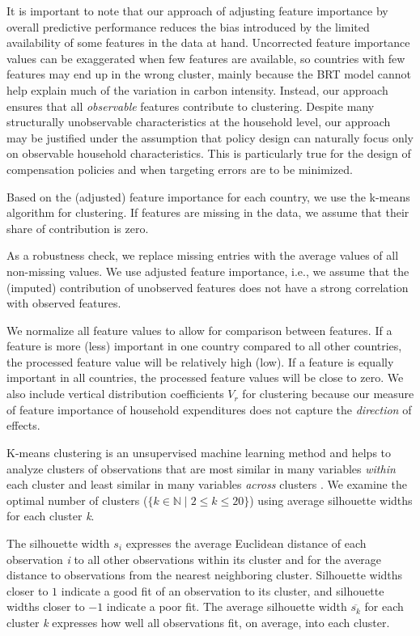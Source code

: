 \documentclass[12pt, a4paper]{article}
\begin{document}
\begin{refsection}
It is important to note that our approach of adjusting feature importance by overall predictive performance reduces the bias introduced by the limited availability of some features in the data at hand. Uncorrected feature importance values can be exaggerated when few features are available, so countries with few features may end up in the wrong cluster, mainly because the BRT model cannot help explain much of the variation in carbon intensity. Instead, our approach ensures that all \textit{observable} features contribute to clustering. Despite many structurally unobservable characteristics at the household level, our approach may be justified under the assumption that policy design can naturally focus only on observable household characteristics. This is particularly true for the design of compensation policies and when targeting errors are to be minimized.

Based on the (adjusted) feature importance for each country, we use the k-means algorithm for clustering. If features are missing in the data, we assume that their share of contribution is zero.

As a robustness check, we replace missing entries with the average values of all non-missing values. We use adjusted feature importance, i.e., we assume that the (imputed) contribution of unobserved features does not have a strong correlation with observed features.

We normalize all feature values to allow for comparison between features. If a feature is more (less) important in one country compared to all other countries, the processed feature value will be relatively high (low). If a feature is equally important in all countries, the processed feature values will be close to zero. We also include vertical distribution coefficients $\widehat{V_{r}}$ for clustering because our measure of feature importance of household expenditures does not capture the \textit{direction} of effects.

K-means clustering is an unsupervised machine learning method and helps to analyze clusters of observations that are most similar in many variables \textit{within} each cluster and least similar in many variables \textit{across} clusters \autocite{MacQueen.1967}. We examine the optimal number of clusters ($\{k \in \mathbb{N} \mid 2  \leq k \leq 20 \}$) using average silhouette widths \autocite{Rousseeuw.1987} for each cluster \textit{k}.

The silhouette width $s_{i}$ expresses the average Euclidean distance of each observation \textit{i} to all other observations within its cluster and for the average distance to observations from the nearest neighboring cluster. Silhouette widths closer to $1$ indicate a good fit of an observation to its cluster, and silhouette widths closer to $-1$ indicate a poor fit. The average silhouette width $\overline{s_{k}}$ for each cluster \textit{k} expresses how well all observations fit, on average, into each cluster.


\end{refsection}
\end{document}
